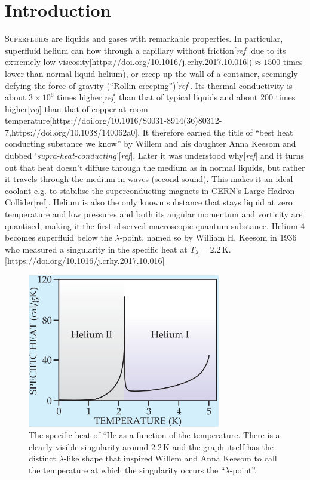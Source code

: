 \documentclass[12pt,a4paper,twosides]{book}
\newcommand{\unit}[1]{\,\mathrm{#1}}
\begin{document}
\tableofcontents

\chapter{Introduction}
	\lettrine[lines=3,findent=3pt,nindent=0pt]{S}{uperfluids} are liquids and gases with remarkable properties. In particular, superfluid helium can flow through a capillary without friction[\emph{ref}] due to its extremely low viscosity[https://doi.org/10.1016/j.crhy.2017.10.016]($\approx\!1500$ times lower than normal liquid helium), or creep up the wall of a container, seemingly defying the force of gravity (``Rollin creeping'')[\emph{ref}]. Its thermal conductivity is about $3\times10^6$ times higher[\emph{ref}] than that of typical liquids and about 200 times higher[\emph{ref}] than that of copper at room temperature[https://doi.org/10.1016/S0031-8914(36)80312-7,https://doi.org/10.1038/140062a0]. It therefore earned the title of ``best heat conducting substance we know'' by Willem and his daughter Anna Keesom and dubbed `\emph{supra-heat-conducting}'[\emph{ref}]. Later it was understood why[\emph{ref}] and it turns out that heat doesn't diffuse through the medium as in normal liquids, but rather it travels through the medium in waves (second sound). This makes it an ideal coolant e.g. to stabilise the superconducting magnets in CERN's Large Hadron Collider[ref]. Helium is also the only known substance that stays liquid at zero temperature and low pressures and both its angular momentum and vorticity are quantised, making it the first observed macroscopic quantum substance. Helium-4 becomes superfluid below the $\lambda$-point, named so by William H. Keesom in 1936 who measured a singularity in the specific heat at $T_\lambda=2.2\unit{K}$.[https://doi.org/10.1016/j.crhy.2017.10.016]\\
	
	\begin{figure}[t]
		\begin{center}
			\includegraphics[width=0.75\textwidth]{specific-heat}
		\end{center}
		\caption{The specific heat of $^4$He as a function of the temperature. There is a clearly visible singularity around $2.2\unit{K}$ and the graph itself has the distinct $\lambda$-like shape that inspired Willem and Anna Keesom to call the temperature at which the singularity occurs the ``$\lambda$-point''.}
		\label{fig:specific-heat}
	\end{figure}	
	
\end{document}

